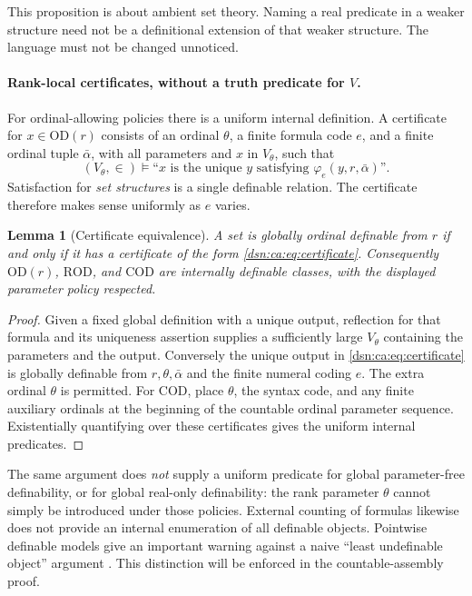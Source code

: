 \documentclass[11pt,a4paper]{article}
\numberwithin{equation}{section}
\newtheorem{lemma}[lemma]{Lemma}
\theoremstyle{definition}
\theoremstyle{remark}
\newcommand{\OD}{\mathrm{OD}}
\newcommand{\ROD}{\mathrm{ROD}}
\newcommand{\COD}{\mathrm{COD}}
\begin{document}
This proposition is about ambient set theory. Naming a real predicate in
a weaker structure need not be a definitional extension of that weaker
structure. The language must not be changed unnoticed.
\paragraph{Rank-local certificates, without a truth predicate for $V$.}
For ordinal-allowing policies there is a uniform internal definition.
A certificate for $x\in\OD(r)$ consists of an ordinal $\theta$, a finite
formula code $e$, and a finite ordinal tuple $\bar\alpha$, with all
parameters and $x$ in $V_\theta$, such that
\begin{equation}\label{dsn:ca:eq:certificate}
 (V_\theta,\in)\models
 \text{``$x$ is the unique $y$ satisfying $\varphi_e(y,r,\bar\alpha)$''}.
\end{equation}
Satisfaction for \emph{set structures} is a single definable relation.
The certificate therefore makes sense uniformly as $e$ varies.

\begin{lemma}[Certificate equivalence]\label{dsn:ca:lem:cert}
A set is globally ordinal definable from $r$ if and only if it has a
certificate of the form \eqref{dsn:ca:eq:certificate}. Consequently $\OD(r)$,
$\ROD$, and $\COD$ are internally definable classes, with the displayed
parameter policy respected.
\end{lemma}
\begin{proof}
Given a fixed global definition with a unique output, reflection for that
formula and its uniqueness assertion supplies a sufficiently large
$V_\theta$ containing the parameters and the output. Conversely the
unique output in \eqref{dsn:ca:eq:certificate} is globally definable from
$r,\theta,\bar\alpha$ and the finite numeral coding $e$. The extra ordinal
$\theta$ is permitted. For $\COD$, place $\theta$, the syntax code, and
any finite auxiliary ordinals at the beginning of the countable ordinal
parameter sequence. Existentially quantifying over these certificates
gives the uniform internal predicates.
\end{proof}

The same argument does \emph{not} supply a uniform predicate for global
parameter-free definability, or for global real-only definability:
the rank parameter $\theta$ cannot simply be introduced under those
policies. External counting of formulas likewise does not provide an
internal enumeration of all definable objects. Pointwise definable
models give an important warning against a naive ``least undefinable
object'' argument \cite{HLR}. This distinction will be enforced in the
countable-assembly proof.
\end{document}
